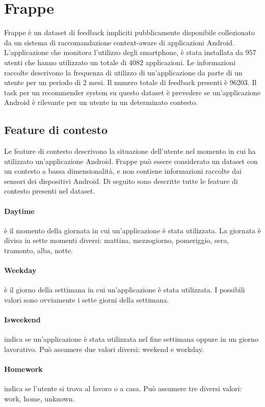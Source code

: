 \documentclass[12pt,italian]{report}
\begin{document}
\section{Frappe}
Frappe \cite{frappe} è un dataset di feedback impliciti pubblicamente disponibile collezionato da un sistema di raccomandazione context-aware di applicazioni Android. L'applicazione che monitora l'utilizzo degli smartphone, è stata installata da 957 utenti che hanno utilizzato un totale di 4082 applicazioni. Le informazioni raccolte descrivono la frequenza di utilizzo di un'applicazione da parte di un utente per un periodo di 2 mesi. Il numero totale di feedback presenti è 96203. Il task per un recommender system su questo dataset è prevedere se un'applicazione Android è rilevante per un utente in un determinato contesto.

\subsection{Feature di contesto}
Le feature di contesto descrivono la situazione dell'utente nel momento in cui ha utilizzato un'applicazione Android. Frappe può essere considerato un dataset con un contesto a bassa dimensionalità, e non contiene informazioni raccolte dai sensori dei dispositivi Android. Di seguito sono descritte tutte le feature di contesto presenti nel dataset.

\paragraph{Daytime} è il momento della giornata in cui un'applicazione è stata utilizzata. La giornata è divisa in sette momenti diversi: mattina, mezzogiorno, pomeriggio, sera, tramonto, alba, notte.

\paragraph{Weekday} è il giorno della settimana in cui un'applicazione è stata utilizzata. I possibili valori sono ovviamente i sette giorni della settimana.

\paragraph{Isweekend} indica se un'applicazione è stata utilizzata nel fine settimana oppure in un giorno lavorativo. Può assumere due valori diversi: weekend e workday.

\paragraph{Homework} indica se l'utente si trova al lavoro o a casa. Può assumere tre diversi valori: work, home, unknown.
\end{document}
